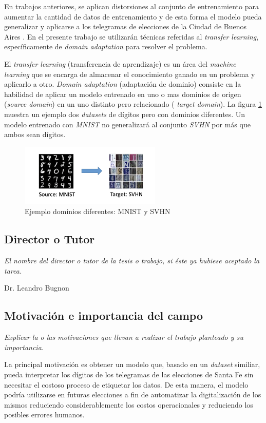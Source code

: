 \documentclass[a4paper, twoside]{report}
\begin{document}
En trabajos anteriores, se aplican distorsiones al conjunto de entrenamiento
para aumentar la cantidad de datos de entrenamiento y de esta forma el modelo
pueda generalizar y aplicarse a los telegramas de elecciones de la Ciudad de
Buenos Aires \cite{Lamagna2016}. En el presente trabajo se utilizar\'an
t\'ecnicas referidas al {\it transfer learning}, espec\'ificamente de {\it
		domain adaptation} para resolver el problema.

El {\it transfer learning} (transferencia de aprendizaje) es un \'area del {\it
		machine learning} que se encarga de almacenar el conocimiento ganado en un
problema y aplicarlo a otro. {\it Domain adaptation} (adaptaci\'on de dominio)
consiste en la habilidad de aplicar un modelo entrenado en uno o mas dominios
de origen ({\it source domain}) en un uno distinto pero relacionado ({\it
		target domain}). La figura \ref{fig:mnist-to-svhn} muestra un ejemplo dos {\it
		datasets} de d\'igitos pero con dominios diferentes. Un modelo entrenado con
	{\it MNIST} no generalizar\'a al conjunto {\it SVHN} por m\'as que ambos sean
d\'igitos.

\begin{figure}[ht]
	\centering
	\includegraphics[width=0.6\textwidth]{mnist-to-svhn.png}
	\caption{Ejemplo dominios diferentes: MNIST y SVHN}
	\label{fig:mnist-to-svhn}
\end{figure}

\subsection*{Director o Tutor}
{\it El nombre del director o tutor de la tesis o trabajo, si éste ya
	hubiese aceptado la tarea.}

Dr. Leandro Bugnon

\subsection*{Motivación e importancia del campo}
{\it Explicar la o las motivaciones que llevan a realizar el trabajo planteado
	y su importancia.}

La principal motivaci\'on es obtener un modelo que, basado en un {\it dataset}
similiar, pueda interpretar los d\'igitos de los telegramas de las elecciones
de Santa Fe sin necesitar el costoso proceso de etiquetar los datos. De esta
manera, el modelo podr\'ia utilizarse en futuras elecciones a fin de
automatizar la digitalizaci\'on de los mismos reduciendo considerablemente los
costos operacionales y reduciendo los posibles errores humanos.
\end{document}
